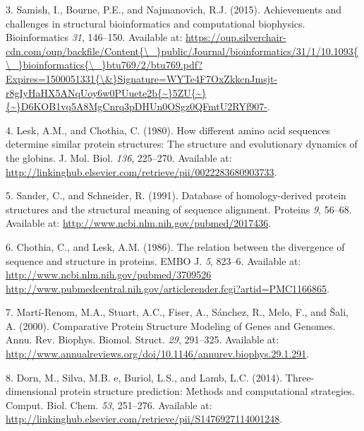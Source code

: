 \documentclass[12pt,a4paper,twoside]{book}
\theoremstyle{definition}
\theoremstyle{definition}
\theoremstyle{remark}
\begin{document}
\hypertarget{ref-Samish2015}{}
3. Samish, I., Bourne, P.E., and Najmanovich, R.J. (2015). Achievements
and challenges in structural bioinformatics and computational
biophysics. Bioinformatics \emph{31}, 146--150. Available at:
\href{https://oup.silverchair-cdn.com/oup/backfile/Content\%7B/_\%7Dpublic/Journal/bioinformatics/31/1/10.1093\%7B/_\%7Dbioinformatics\%7B/_\%7Dbtu769/2/btu769.pdf?Expires=1500051331\%7B/\&\%7DSignature=WYTe4F7OxZkkcnJmsjt-r8gIyHaHX5ANqUoy6w0PUuete2b\%7B~\%7D5ZU\%7B~\%7D\%7B~\%7DD6KOB1vq5A8MgCnrq3pDHUn0OSgz0QFmtU2RYf907-}{https://oup.silverchair-cdn.com/oup/backfile/Content\{\textbackslash{}\_\}public/Journal/bioinformatics/31/1/10.1093\{\textbackslash{}\_\}bioinformatics\{\textbackslash{}\_\}btu769/2/btu769.pdf?Expires=1500051331\{\textbackslash{}\&\}Signature=WYTe4F7OxZkkcnJmsjt-r8gIyHaHX5ANqUoy6w0PUuete2b\{\textasciitilde{}\}5ZU\{\textasciitilde{}\}\{\textasciitilde{}\}D6KOB1vq5A8MgCnrq3pDHUn0OSgz0QFmtU2RYf907-}.

\hypertarget{ref-Lesk1980}{}
4. Lesk, A.M., and Chothia, C. (1980). How different amino acid
sequences determine similar protein structures: The structure and
evolutionary dynamics of the globins. J. Mol. Biol. \emph{136},
225--270. Available at:
\url{http://linkinghub.elsevier.com/retrieve/pii/0022283680903733}.

\hypertarget{ref-Sander1991}{}
5. Sander, C., and Schneider, R. (1991). Database of homology-derived
protein structures and the structural meaning of sequence alignment.
Proteins \emph{9}, 56--68. Available at:
\url{http://www.ncbi.nlm.nih.gov/pubmed/2017436}.

\hypertarget{ref-Chothia1986}{}
6. Chothia, C., and Lesk, A.M. (1986). The relation between the
divergence of sequence and structure in proteins. EMBO J. \emph{5},
823--6. Available at:
\href{http://www.ncbi.nlm.nih.gov/pubmed/3709526\%20http://www.pubmedcentral.nih.gov/articlerender.fcgi?artid=PMC1166865}{http://www.ncbi.nlm.nih.gov/pubmed/3709526 http://www.pubmedcentral.nih.gov/articlerender.fcgi?artid=PMC1166865}.

\hypertarget{ref-Marti-Renom2000}{}
7. Martí-Renom, M.A., Stuart, A.C., Fiser, A., Sánchez, R., Melo, F.,
and Šali, A. (2000). Comparative Protein Structure Modeling of Genes and
Genomes. Annu. Rev. Biophys. Biomol. Struct. \emph{29}, 291--325.
Available at:
\url{http://www.annualreviews.org/doi/10.1146/annurev.biophys.29.1.291}.

\hypertarget{ref-Dorn2014}{}
8. Dorn, M., Silva, M.B. e, Buriol, L.S., and Lamb, L.C. (2014).
Three-dimensional protein structure prediction: Methods and
computational strategies. Comput. Biol. Chem. \emph{53}, 251--276.
Available at:
\url{http://linkinghub.elsevier.com/retrieve/pii/S1476927114001248}.
\end{document}
